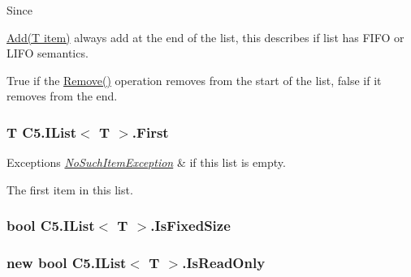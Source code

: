 Since 

{\ttfamily \hyperlink{interface_c5_1_1_i_list_a800000d7344d000c1b8c67acda464a3d}{Add(\+T item)}} always add at the end of the list, this describes if list has F\+I\+F\+O or L\+I\+F\+O semantics. 

True if the {\ttfamily \hyperlink{interface_c5_1_1_i_list_ae0d9be125f478fed048c4c08159ae399}{Remove()}} operation removes from the start of the list, false if it removes from the end.\hypertarget{interface_c5_1_1_i_list_a4bf9eeadd149cdffd72702f4ab1db0ba}{}
\subsubsection[{First}]{\setlength{\rightskip}{0pt plus 5cm}T {\bf C5.\+I\+List}$<$ T $>$.First\hspace{0.3cm}{\ttfamily [get]}}\label{interface_c5_1_1_i_list_a4bf9eeadd149cdffd72702f4ab1db0ba}





\begin{DoxyExceptions}{Exceptions}
{\em \hyperlink{class_c5_1_1_no_such_item_exception}{No\+Such\+Item\+Exception}} & if this list is empty.\\
\hline
\end{DoxyExceptions}


The first item in this list.\hypertarget{interface_c5_1_1_i_list_a265a2e21d24096940bc8c51ff7255a9b}{}
\subsubsection[{Is\+Fixed\+Size}]{\setlength{\rightskip}{0pt plus 5cm}bool {\bf C5.\+I\+List}$<$ T $>$.Is\+Fixed\+Size\hspace{0.3cm}{\ttfamily [get]}}\label{interface_c5_1_1_i_list_a265a2e21d24096940bc8c51ff7255a9b}




\hypertarget{interface_c5_1_1_i_list_a413032c05b1f8f4f060afb4ab3f3b579}{}
\subsubsection[{Is\+Read\+Only}]{\setlength{\rightskip}{0pt plus 5cm}new bool {\bf C5.\+I\+List}$<$ T $>$.Is\+Read\+Only\hspace{0.3cm}{\ttfamily [get]}}\label{interface_c5_1_1_i_list_a413032c05b1f8f4f060afb4ab3f3b579}




